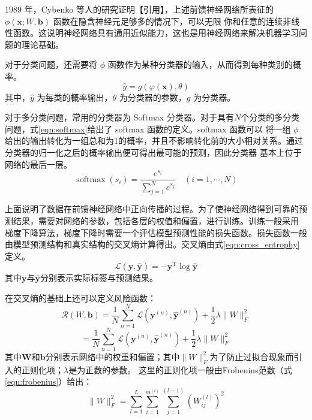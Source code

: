1989 年，Cybenko 等人的研究证明【引用】，上述前馈神经网络所表征的 $\phi(\mathbf{x} ; W, \mathbf{b})$ 函数在隐含神经元足够多的情况下，可以无限
你和任意的连续非线性函数。这说明神经网络具有通用近似能力，这也是用神经网络来解决机器学习问题的理论基础。

对于分类问题，还需要将 $\phi$ 函数作为某种分类器的输入，从而得到每种类别的概率。
\begin{equation} 
\hat{y}=g(\varphi(\mathbf{x}), \theta)
\end{equation}
其中，$\hat{y}$ 为每类的概率输出，$\theta$ 为分类器的参数，$g$ 为分类器。

对于多分类问题，常用的分类器为 Softmax 分类器。对于具有$N$个分类的多分类问题，式\ref{eqn:softmax}给出了 softmax 函数的定义。softmax 函数可以
将一组 $\phi$ 给出的输出转化为一组总和为1的概率，并且不影响转化前的大小相对关系。通过分类器的归一化之后的概率输出便可得出最可能的预测，因此分类器
基本上位于网络的最后一层。
\begin{equation} 
\label{eqn:softmax}
\operatorname{softmax}\left(s_{i}\right)=\frac{e^{s_{i}}}{\sum_{j=1}^{N} e^{s_{j}}} \quad(i=1, \cdots, N)
\end{equation}

上面说明了数据在前馈神经网络中正向传播的过程。为了使神经网络得到可靠的预测结果，需要对网络的参数，包括各层的权值和偏置，进行训练。训练一般采用
梯度下降算法，梯度下降时需要一个评估模型预测性能的损失函数。损失函数一般由模型预测结构和真实结构的交叉熵计算得出。交叉熵由式\ref{eqn:cross_entrophy}定义。
\begin{equation}
\label{eqn:cross_entrophy} 
\mathcal{L}(\mathbf{y}, \hat{\mathbf{y}})=-\mathbf{y}^{\mathrm{T}} \log \hat{\mathbf{y}}
 \end{equation}
其中$\mathbf{y}$与$\hat{\mathbf{y}}$分别表示实际标签与预测结果。

在交叉熵的基础上还可以定义风险函数：
\begin{equation} 
\mathcal{R}(W, \mathbf{b})=\frac{1}{N} \sum_{n=1}^{N} \mathcal{L}\left(\mathbf{y}^{(n)}, \hat{\mathbf{y}}^{(n)}\right)+\frac{1}{2} \lambda\|W\|_{F}^{2}
\end{equation}
\begin{equation} 
=\frac{1}{N} \sum_{n=1}^{N} \mathcal{L}\left(\mathbf{y}^{(n)}, \hat{\mathbf{y}}^{(n)}\right)+\frac{1}{2} \lambda\|W\|_{F}^{2}
\end{equation}
其中$\mathbf{W}$和$\mathbf{b}$分别表示网络中的权重和偏置；其中$\|W\|_{F}^{2}$为了防止过拟合现象而引入的正则化项；$\lambda$是为正数的参数。
这里的正则化项一般由Frobenius范数（式\ref{eqn:frobenius}）给出：
\begin{equation} 
\label{eqn:frobenius}
\|W\|_{F}^{2}=\sum_{l=1}^{L} \sum_{i=1}^{m^{(l)}} \sum_{j=1}^{(l-1)}\left(W_{i j}^{(l)}\right)^{2}
\end{equation}


